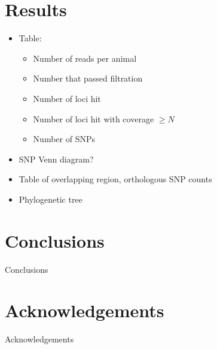 \documentclass[12pt]{article}
\begin{document}
\section{Results}
\begin{itemize}
	\item Table: 
	\begin{itemize}
		\item Number of reads per animal
		\item Number that passed filtration
		\item Number of loci hit
		\item Number of loci hit with coverage $\ge N$
		\item Number of SNPs
	\end{itemize}
	\item SNP Venn diagram?
	\item Table of overlapping region, orthologous SNP counts
	\item Phylogenetic tree
\end{itemize}

\section{Conclusions}
Conclusions

\section{Acknowledgements}
Acknowledgements
\end{document}
